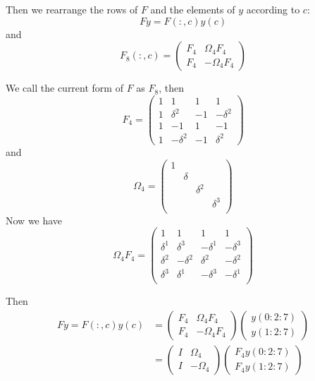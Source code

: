 Then we rearrange the rows of $F$ and the elements of $y$ according to $c$:
\[
    Fy = F(:, c) y(c)
\]
and \[
    F_8(:, c) = \begin{pmatrix}
        F_4 & \Omega_4 F_4 \\
        F_4 & -\Omega_4 F_4
    \end{pmatrix}
\]

We call the current form of $F$ as $F_8$, then \[
    F_4 = \begin{pmatrix}
        1 & 1 & 1 & 1 \\
        1 & \delta^2 & -1 & -\delta^2 \\
        1 & -1 & 1 & -1 \\
        1 & -\delta^2 & -1 & \delta^2
    \end{pmatrix}
\]
and \[
    \Omega_4 = \begin{pmatrix}
        1& & & \\    
        & \delta & & \\
        & & \delta^2 & \\
        & & & \delta^3 \\
    \end{pmatrix}
\]
Now we have \[
    \Omega_4 F_4 = \begin{pmatrix}
        1 & 1 & 1 & 1 \\
        \delta^1 & \delta^3 & -\delta^1 & -\delta^3 \\
        \delta^2 & -\delta^2 & \delta^2 & -\delta^2 \\
        \delta^3 & \delta^1 & -\delta^3 & -\delta^1 \\
    \end{pmatrix}
\]

Then \begin{align*}
    Fy = F(:, c) y(c) &= \begin{pmatrix}
        F_4 & \Omega_4 F_4 \\
        F_4 & -\Omega_4 F_4
    \end{pmatrix} \begin{pmatrix}
        y(0: 2 : 7) \\
        y(1: 2 : 7)
    \end{pmatrix} \\
    &= \begin{pmatrix}
        I & \Omega_4 \\
        I & -\Omega_4
    \end{pmatrix} \begin{pmatrix}
        F_4y(0: 2 : 7) \\
        F_4y(1: 2 : 7)
    \end{pmatrix}
\end{align*}

